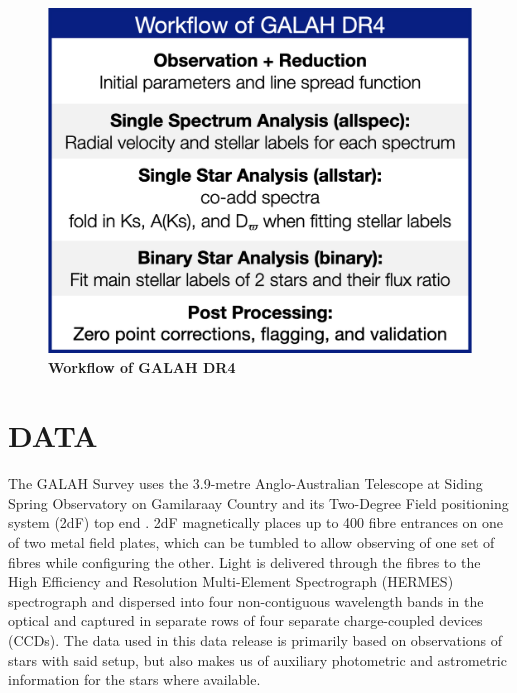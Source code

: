 \documentclass[
  journal=pasa,
  manuscript=research-paper, %
  year=2023,
  volume=37
]{cup-journal}
\begin{document}
\begin{figure}[ht]
 \centering
 \includegraphics[width=\textwidth]{figures/workflow_galah_dr4.png}
 \caption{\textbf{Workflow of GALAH DR4}}
 \label{fig:workflow_galah_dr4}
\end{figure}

\section{DATA}
\label{sec:data}

The GALAH Survey uses the 3.9-metre Anglo-Australian Telescope at Siding Spring Observatory on Gamilaraay Country and its Two-Degree Field positioning system (2dF) top end \citep{Lewis2002}. 2dF magnetically places up to 400 fibre entrances on one of two metal field plates, which can be tumbled to allow observing of one set of fibres while configuring the other. Light is delivered through the fibres to the High Efficiency and Resolution Multi-Element Spectrograph (HERMES) spectrograph \citep{Barden2010, Brzeski2011, Heijmans2012, Farrell2014, Sheinis2015} and dispersed into four non-contiguous wavelength bands in the optical and captured in separate rows of four separate charge-coupled devices (CCDs). The data used in this data release is primarily based on observations of stars with said setup, but also makes us of auxiliary photometric and astrometric information for the stars where available.
\end{document}
